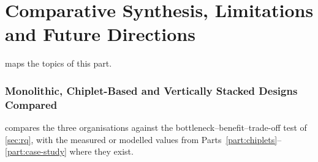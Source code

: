 \clearpage
\part{Comparative Synthesis, Limitations and Future Directions}
\label{part:synthesis}
 maps the topics of this part.



\section{Monolithic, Chiplet-Based and Vertically Stacked Designs Compared}
\label{sec:comparison}

 compares the three organisations against the bottleneck--benefit--trade-off test of \cref{sec:rq}, with the measured or modelled values from Parts~\ref{part:chiplets}--\ref{part:case-study} where they exist.

